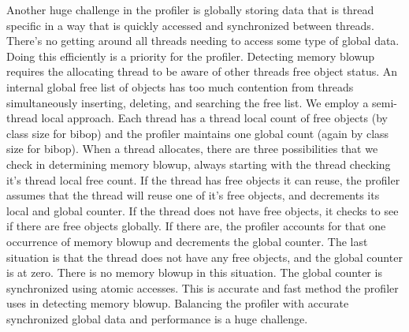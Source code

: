 			Another huge challenge in the profiler is globally storing data that is thread specific in a way that is quickly accessed and synchronized between threads. There's no getting around all threads needing to access some type of global data. Doing this efficiently is a priority for the profiler. Detecting memory blowup requires the allocating thread to be aware of other threads free object status. An internal global free list of objects has too much contention from threads simultaneously inserting, deleting, and searching the free list. We employ a semi-thread local approach. Each thread has a thread local count of free objects (by class size for bibop) and the profiler maintains one global count (again by class size for bibop). When a thread allocates, there are three possibilities that we check in determining memory blowup, always starting with the thread checking it's thread local free count. If the thread has free objects it can reuse, the profiler assumes that the thread will reuse one of it's free objects, and decrements its local and global counter. If the thread does not have free objects, it checks to see if there are free objects globally. If there are, the profiler accounts for that one occurrence of memory blowup and decrements the global counter. The last situation is that the thread does not have any free objects, and the global counter is at zero. There is no memory blowup in this situation. The global counter is synchronized using atomic accesses. This is accurate and fast method the profiler uses in detecting memory blowup. Balancing the profiler with accurate synchronized global data and performance is a huge challenge.

